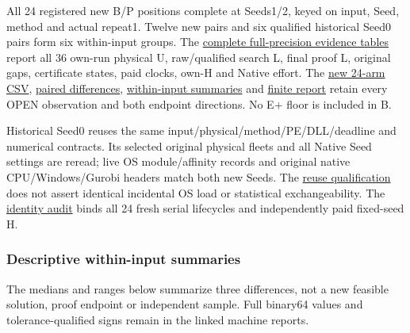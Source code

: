 \documentclass[
  american,
  11pt,
]{article}
\begin{document}
All 24 registered new B/P positions complete at Seeds1/2, keyed on
input, Seed, method and actual repeat1. Twelve new pairs and six
qualified historical Seed0 pairs form six within-input groups. The
\href{https://github.com/yifanXovo/TailoredExact/blob/codex/round172-journal-manuscript/results/unified_exact_round164/reports/seed_evidence.md}{complete
full-precision evidence tables} report all 36 own-run physical U,
raw/qualified search L, final proof L, original gaps, certificate
states, paid clocks, own-H and Native effort. The
\href{https://github.com/yifanXovo/TailoredExact/blob/codex/round172-journal-manuscript/results/unified_exact_round164/reports/complete.csv}{new
24-arm CSV},
\href{https://github.com/yifanXovo/TailoredExact/blob/codex/round172-journal-manuscript/results/unified_exact_round164/reports/three_seed_comparisons.json}{paired
differences},
\href{https://github.com/yifanXovo/TailoredExact/blob/codex/round172-journal-manuscript/results/unified_exact_round164/reports/within_configuration.json}{within-input
summaries} and
\href{https://github.com/yifanXovo/TailoredExact/blob/codex/round172-journal-manuscript/results/unified_exact_round164/final_report.md}{finite
report} retain every OPEN observation and both endpoint directions. No
E+ floor is included in B.

Historical Seed0 reuses the same input/physical/method/PE/DLL/deadline
and numerical contracts. Its selected original physical fleets and all
Native Seed settings are reread; live OS module/affinity records and
original native CPU/Windows/Gurobi headers match both new Seeds. The
\href{https://github.com/yifanXovo/TailoredExact/blob/codex/round172-journal-manuscript/results/unified_exact_round164/Seed0_reuse_qualification.json}{reuse
qualification} does not assert identical incidental OS load or
statistical exchangeability. The
\href{https://github.com/yifanXovo/TailoredExact/blob/codex/round172-journal-manuscript/results/unified_exact_round164/science_identity.json}{identity
audit} binds all 24 fresh serial lifecycles and independently paid
fixed-seed H.

\subsubsection{Descriptive within-input
summaries}\label{descriptive-within-input-summaries}

The medians and ranges below summarize three differences, not a new
feasible solution, proof endpoint or independent sample. Full binary64
values and tolerance-qualified signs remain in the linked machine
reports.
\end{document}
